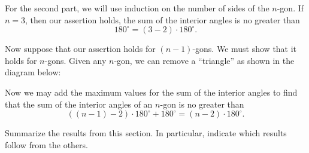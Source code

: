 \documentclass{ximera}
\begin{document}
\begin{problem}
\begin{freeResponse}
For the second part, we will use induction on the number of sides of
the $n$-gon. If $n=3$, then our assertion holds, the sum of the interior angles is no greater than 
\[
180^\circ = (3-2) \cdot 180^\circ. 
\]

Now suppose that our assertion holds for $(n-1)$-gons. We must show
that it holds for $n$-gons. Given any $n$-gon, we can remove a
``triangle'' as shown in the diagram below:
\begin{image}
\end{image}
Now we may add the maximum values for the sum of the interior angles
to find that the sum of the interior angles of an $n$-gon is no
greater than
\[
((n-1)-2)\cdot 180^\circ + 180^\circ = (n-2)\cdot 180^\circ.
\]
\end{freeResponse}

\end{problem}



\begin{problem}
Summarize the results from this section. In particular, indicate which
results follow from the others.
\end{problem}
\end{document}
